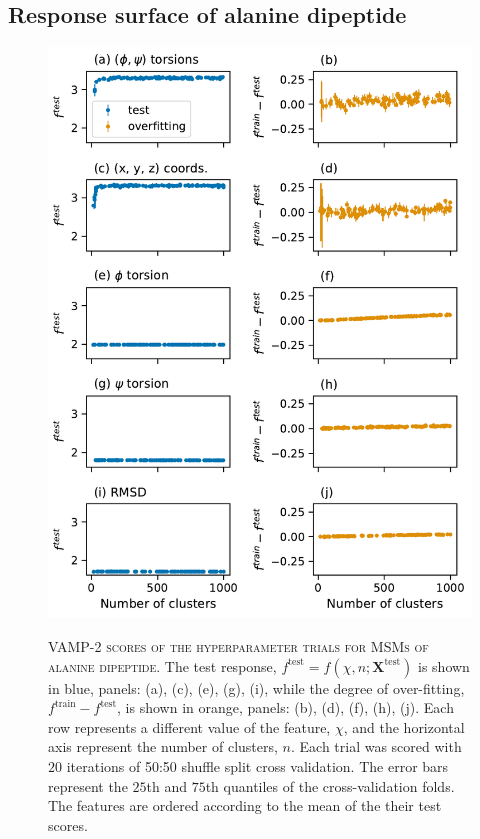 \subsection{Response surface of alanine dipeptide}\label{sec:ala_rsm}

\begin{figure}[p]
    \centering
    \caption[VAMP-2 scores of the hyperparameter trials for MSMs of alanine dipeptide]{\textsc{VAMP-2 scores of the hyperparameter trials for MSMs of alanine dipeptide}. The test response, $f^{\mathrm{test}} = f(\chi, n; \mathbf{X}^{\mathrm{test}})$ is shown in blue, panels: (a), (c), (e), (g), (i),  while the degree of over-fitting, $f^{\mathrm{train}} - f^{\mathrm{test}}$, is shown in orange, panels: (b), (d), (f), (h), (j). Each row represents a different value of the feature, $\chi$, and the horizontal axis represent the number of clusters, $n$. Each trial was scored with $20$ iterations of 50:50 shuffle split cross validation. The error bars represent the $25$th and $75$th quantiles of the cross-validation folds. 
    The features are ordered according to the mean of the their test scores.}
    \includegraphics[height=0.8\textheight]{chapters/msm_optimization/figures/ala1_train_test_results.pdf}
    \label{fig:ala1_train_test}
\end{figure}




